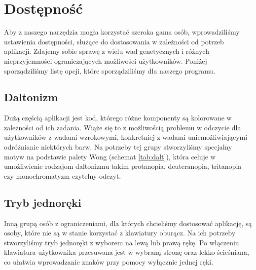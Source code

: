\chapter{Dostępność}
Aby z naszego narzędzia mogła korzystać szeroka gama osób, wprowadziliśmy ustawienia dostępności, służące do dostosowania w zależności od potrzeb aplikacji. Zdajemy sobie sprawę z wielu wad genetycznych i różnych nieprzyjemności ograniczających możliwości użytkowników. Poniżej sporządziliśmy listę opcji, które sporządziliśmy dla naszego programu.

\section{Daltonizm}

Dużą częścią aplikacji jest kod, którego różne komponenty są kolorowane w zależności od ich zadania. Wiąże się to z możliwością problemu w odczycie dla użytkowników z wadami wzrokowymi, konkretniej z wadami uniemożliwiającymi odróżnianie niektórych barw. Na potrzeby tej grupy stworzyliśmy specjalny motyw na podstawie palety Wong (schemat \ref{tab:dalt}), która celuje w umożliwienie rodzajom daltonizmu takim protanopia, deuteranopia, tritanopia czy monochromatyzm czytelny odczyt.

\section{Tryb jednoręki}
Inną grupą osób z ograniczeniami, dla których chcieliśmy dostosować aplikację, są osoby, które nie są w stanie korzystać z klawiatury oburącz. Na ich potrzeby stworzyliśmy tryb jednoręki z wyborem na lewą lub prawą rękę. Po włączeniu klawiatura użytkownika przesuwana jest w wybraną stronę oraz lekko ścieśniana, co ułatwia wprowadzanie znaków przy pomocy wyłącznie jednej ręki.

